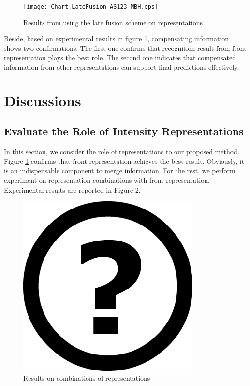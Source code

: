 \documentclass[review]{elsarticle}
\begin{document}
\begin{figure}[H]
	\begin{center}
		\texttt{[image: Chart\_LateFusion\_AS123\_MBH.eps]}
	\end{center}
	\caption{\label{lbl:Figure_LateFusion_AS123_MBH}Results from using the late fusion scheme on representations}
\end{figure}
 
Beside, based on experimental results in figure \ref{lbl:Figure_LateFusion_AS123_MBH}, compensating information shows two confirmations. The first one confirms that recognition result from front representation plays the best role. The second one indicates that compensated information from other representations can support final predictions effectively.

\section{Discussions}

\subsection{Evaluate the Role of Intensity Representations}

In this section, we consider the role of representations to our proposed method. Figure \ref{lbl:Figure_LateFusion_AS123_MBH} confirms that front representation achieves the best result. Obviously, it is an indispensable component to merge information. For the rest, we perform experiment on representation combinations with front representation. Experimental results are reported in Figure \ref{lbl:Figure_CombinationsFRONTSIDETOP}.

\begin{figure}[H]
	\begin{center}
		\includegraphics[scale=0.5]{Unknown.png}
	\end{center}
	\caption{\label{lbl:Figure_CombinationsFRONTSIDETOP}Results on combinations of representations}
\end{figure}
\end{document}
